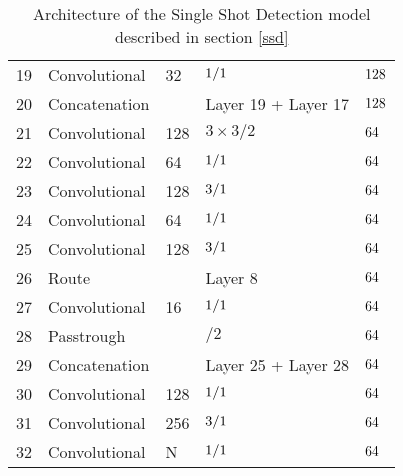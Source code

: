 \begin{table}[h!]
\begin{tabular}{@{}lllll@{}}
19    & Convolutional & 32      &  $1 \time 1/1 $               &$ 128 \time 128$ \\
20    & Concatenation &         &  Layer 19 + Layer 17          &$ 128 \time 128$ \\
21    & Convolutional & 128     &  $3 \times 3/2$               &$ 64 \time 64$ \\
22    & Convolutional & 64      &  $1 \time 1/1  $              &$ 64 \time 64$ \\
23    & Convolutional & 128     &  $3 \time 3/1  $              &$ 64 \time 64$ \\
24    & Convolutional & 64      &  $1 \time 1/1  $              &$ 64 \time 64$ \\
25    & Convolutional & 128     &  $3 \time 3/1  $              &$ 64 \time 64$ \\
26    & Route         &         &  Layer 8                      &$ 64 \time 64$ \\
27    & Convolutional & 16      &  $1 \time 1/1$                &$ 64 \time 64$ \\
28    & Passtrough    &         &  $/2$                         &$ 64 \time 64$ \\
29    & Concatenation&         &  Layer 25 + Layer 28           &$ 64 \time 64$ \\
30    & Convolutional & 128     & $ 1 \time 1/1 $               &$ 64 \time 64$ \\
31    & Convolutional & 256     & $ 3 \time 3/1 $               &$ 64 \time 64$ \\ 
32   & Convolutional &  N       & $ 1 \time 1/1 $               &$ 64 \time 64$ \\ \bottomrule
\end{tabular}
	\caption{Architecture of the Single Shot Detection model described in section \ref{ssd}}
\label{tab:SSDArchi}
\end{table}


